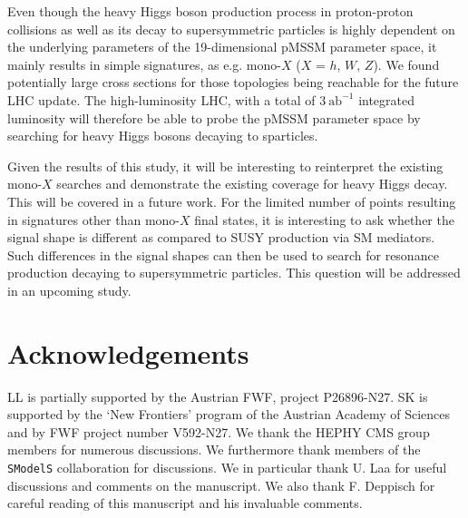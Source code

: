 \documentclass[11pt,a4paper]{article}
\begin{document}
Even though the heavy Higgs boson production process in proton-proton collisions as well as its decay to supersymmetric particles is highly dependent on the underlying parameters of the 19-dimensional pMSSM parameter space, it mainly results in simple signatures, as e.g. mono-$X$ ($X$ = $h$, $W$, $Z$). We found potentially large cross sections for those topologies being reachable for the future LHC update. The high-luminosity LHC, with a total of $3~\text{ab}^{-1}$ integrated luminosity will therefore be able to probe the pMSSM parameter space by searching for heavy Higgs bosons decaying to sparticles. 

Given the results of this study, it will be interesting to reinterpret the existing mono-$X$ searches and demonstrate the existing coverage for heavy Higgs decay. This will be covered in a future work. For the limited number of points resulting in signatures other than mono-$X$ final states, it is interesting to ask whether the signal shape is different as compared to SUSY production via SM mediators. Such differences in the signal shapes can then be used to search for resonance production decaying to supersymmetric particles. This question will be addressed in an upcoming study.
 
\section*{Acknowledgements}
LL is partially supported by the Austrian FWF, project P26896-N27. SK is supported by the `New Frontiers' program of the Austrian Academy of Sciences and by FWF project number V592-N27. We thank the HEPHY CMS group members for numerous discussions. We furthermore thank members of the \texttt{SModelS} collaboration for discussions. We in particular thank U. Laa for useful discussions and comments on the manuscript. We also thank F. Deppisch for careful reading of this manuscript and his invaluable comments.


\end{document}
